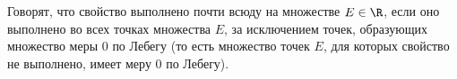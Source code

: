\label{BEST}
 	Говорят, что свойство выполнено почти всюду на множестве $E\in\R$, если оно выполнено во всех точках множества $E$, за исключением
 	точек, образующих множество меры $0$ по Лебегу (то есть множество точек $E$, для которых свойство не выполнено, имеет меру $0$ по Лебегу).
 
